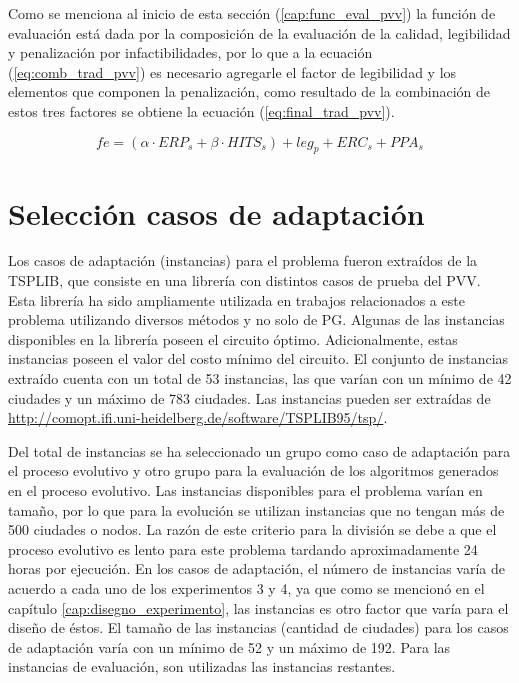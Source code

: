Como se menciona al inicio de esta sección (\ref{cap:func_eval_pvv}) la función de evaluación está dada por la composición de la evaluación de la calidad, legibilidad y penalización por infactibilidades, por lo que a la ecuación (\ref{eq:comb_trad_pvv}) es necesario agregarle el factor de legibilidad y los elementos que componen la penalización, como resultado de la combinación de estos tres factores se obtiene la ecuación (\ref{eq:final_trad_pvv}).

\begin{equation}
\label{eq:final_trad_pvv}
	fe = (\alpha\cdot ERP_{s}+ \beta\cdot HITS_{s}) + leg_{p} + ERC_{s} + PPA_{s}
\end{equation}


\section{Selección casos de adaptación}
\label{cap:sel_casos_adapt_pvv}

Los casos de adaptación (instancias) para el problema fueron extraídos de la TSPLIB, que consiste en una librería con distintos casos de prueba del PVV. Esta librería ha sido ampliamente utilizada en trabajos relacionados a este problema utilizando diversos métodos y no solo de PG. Algunas de las instancias disponibles en la librería poseen el circuito óptimo. Adicionalmente, estas instancias poseen el valor del costo mínimo del circuito. El conjunto de instancias extraído cuenta con un total de 53 instancias, las que varían con un mínimo de 42 ciudades y un máximo de 783 ciudades. Las instancias pueden ser extraídas de \url{http://comopt.ifi.uni-heidelberg.de/software/TSPLIB95/tsp/}.

Del total de instancias se ha seleccionado un grupo como caso de adaptación para el proceso evolutivo y otro grupo para la evaluación de los algoritmos generados en el proceso evolutivo. Las instancias disponibles para el problema varían en tamaño, por lo que para la evolución se utilizan instancias que no tengan más de 500 ciudades o nodos. La razón de este criterio para la división se debe a que el proceso evolutivo es lento para este problema tardando aproximadamente 24 horas por ejecución. En los casos de adaptación, el número de instancias varía de acuerdo a cada uno de los experimentos 3 y 4, ya que como se mencionó en el capítulo \ref{cap:disegno_experimento}, las instancias es otro factor que varía para el diseño de éstos. El tamaño de las instancias (cantidad de ciudades) para los casos de adaptación varía con un mínimo de 52 y un máximo de 192. Para las instancias de evaluación, son utilizadas las instancias restantes.

